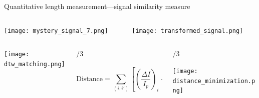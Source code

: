 
\begin{frame}[c]{Quantitative length measurement---signal similarity measure}
	\vspace{-.1in}
	\begin{columns}[t]
	
		\begin{column}[T]{2.25in}
			{\centering
				\texttt{[image: mystery\_signal\_7.png]} \\
				\par
			}
		\end{column}
		
		\begin{column}[T]{2.25in}
			{\centering
				\texttt{[image: transformed\_signal.png]} \\
				\par
			}
		\end{column}

	\end{columns}

	\vspace{.2in}	
	
	\begin{columns}[t]
	
		\begin{column}[T]{1.25in}
			{\centering
				\texttt{[image: dtw\_matching.png]} \\
				\par
			}
		\end{column}
		
		\begin{column}[T]{\paperwidth/3}
			{\centering
				\vspace{.2in}
				{\tiny \[\mathrm{Distance}=\sum_{\left(i,i'\right)}\left[\left(\frac{\Delta I}{I_{p}}\right)_{i}-\left(\frac{\Delta I}{I_{p}}\right)_{i'}\right]^{2} \] } \\
				\par
			}
		\end{column}
		
		\begin{column}[T]{\paperwidth/3}
			{\centering
				\vspace{.3in}
				\texttt{[image: distance\_minimization.png]} \\
				\par
			}
		\end{column}


\end{columns}
\end{frame}
